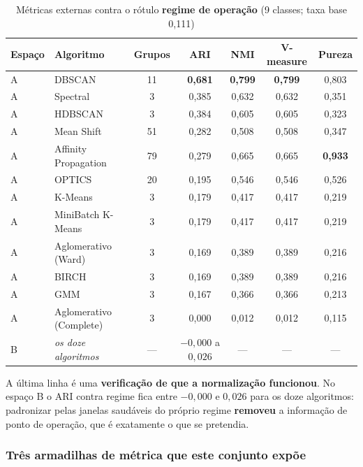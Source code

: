 \documentclass[12pt,a4paper]{article}
\begin{document}
\begin{table}[H]
\centering
\caption{Métricas externas contra o rótulo \textbf{regime de operação} (9 classes; taxa base 0,111)}
\label{tab:externas-regime}
\begin{tabular}{llccccc}
\toprule
Espaço & Algoritmo & Grupos & ARI & NMI & V-measure & Pureza \\
\midrule
A & DBSCAN                  & 11 & \textbf{0{,}681} & \textbf{0{,}799} & \textbf{0{,}799} & 0{,}803 \\
A & Spectral                & 3  & 0{,}385 & 0{,}632 & 0{,}632 & 0{,}351 \\
A & HDBSCAN                 & 3  & 0{,}384 & 0{,}605 & 0{,}605 & 0{,}323 \\
A & Mean Shift              & 51 & 0{,}282 & 0{,}508 & 0{,}508 & 0{,}347 \\
A & Affinity Propagation    & 79 & 0{,}279 & 0{,}665 & 0{,}665 & \textbf{0{,}933} \\
A & OPTICS                  & 20 & 0{,}195 & 0{,}546 & 0{,}546 & 0{,}526 \\
A & K-Means                 & 3  & 0{,}179 & 0{,}417 & 0{,}417 & 0{,}219 \\
A & MiniBatch K-Means       & 3  & 0{,}179 & 0{,}417 & 0{,}417 & 0{,}219 \\
A & Aglomerativo (Ward)     & 3  & 0{,}169 & 0{,}389 & 0{,}389 & 0{,}216 \\
A & BIRCH                   & 3  & 0{,}169 & 0{,}389 & 0{,}389 & 0{,}216 \\
A & GMM                     & 3  & 0{,}167 & 0{,}366 & 0{,}366 & 0{,}213 \\
A & Aglomerativo (Complete) & 3  & 0{,}000 & 0{,}012 & 0{,}012 & 0{,}115 \\
\midrule
B & \emph{os doze algoritmos} & --- & $-0{,}000$ a $0{,}026$ & --- & --- & --- \\
\bottomrule
\end{tabular}
\end{table}

\noindent A última linha é uma \textbf{verificação de que a normalização funcionou}. No espaço B o ARI contra regime fica entre $-0{,}000$ e $0{,}026$ para os doze algoritmos: padronizar pelas janelas saudáveis do próprio regime \textbf{removeu} a informação de ponto de operação, que é exatamente o que se pretendia.

\subsubsection*{Três armadilhas de métrica que este conjunto expõe}
\end{document}
